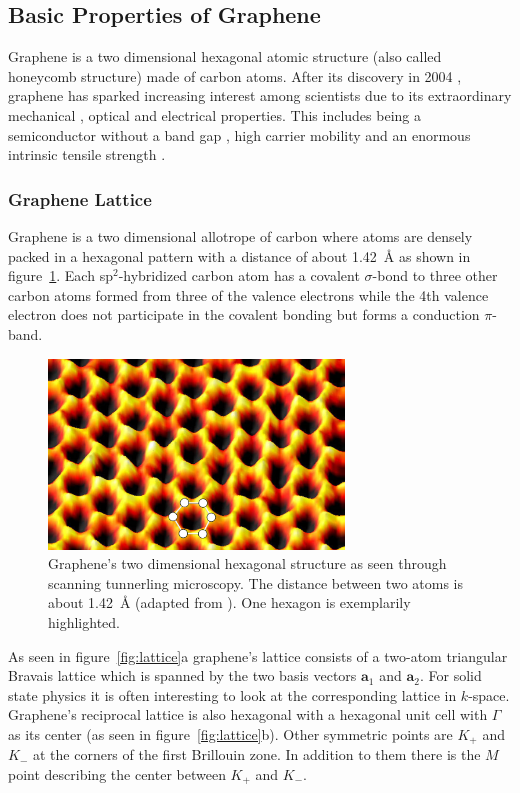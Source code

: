 \subsection{Basic Properties of Graphene}

Graphene is a two dimensional hexagonal atomic structure (also called honeycomb structure) made of carbon atoms. After its discovery in 2004 \cite{novoselov}, graphene has sparked increasing interest among scientists due to its extraordinary mechanical \cite{strength}, optical \cite{optical} and electrical \cite{carrier} properties. This includes being a semiconductor without a band gap \cite{Lherbier2012}, high carrier mobility\cite{carrier} and an enormous intrinsic tensile strength \cite{strength}.

\subsubsection{Graphene Lattice}

Graphene is a two dimensional allotrope of carbon where atoms are densely packed in a hexagonal pattern with a distance of about \SI{1.42}{\angstrom} as shown in figure~\ref{fig:spm}. Each sp$^2$-hybridized carbon atom has a covalent $\sigma$-bond to three other carbon atoms formed from three of the valence electrons while the 4th valence electron does not participate in the covalent bonding but forms a conduction $\pi$-band.

\begin{figure}[!h]
  \centering
  \includegraphics[width=0.7\textwidth]{./images/graphene-spm.png}
  \caption{Graphene's two dimensional hexagonal structure as seen through scanning tunnerling microscopy. The distance between two atoms is about \SI{1.42}{\angstrom} (adapted from \cite{graphene-spm}). One hexagon is exemplarily highlighted.}
  \label{fig:spm}
\end{figure}

As seen in figure~\ref{fig:lattice}a graphene's lattice consists of a two-atom triangular Bravais lattice which is spanned by the two basis vectors $\mathbf{a}_1$ and $\mathbf{a}_2$. For solid state physics it is often interesting to look at the corresponding lattice in $k$-space. Graphene's reciprocal lattice is also hexagonal with a hexagonal unit cell with $\Gamma$ as its center (as seen in figure~\ref{fig:lattice}b). Other symmetric points are $K_+$ and $K_-$ at the corners of the first Brillouin zone. In addition to them there is the $M$ point describing the center between $K_+$ and $K_-$.

